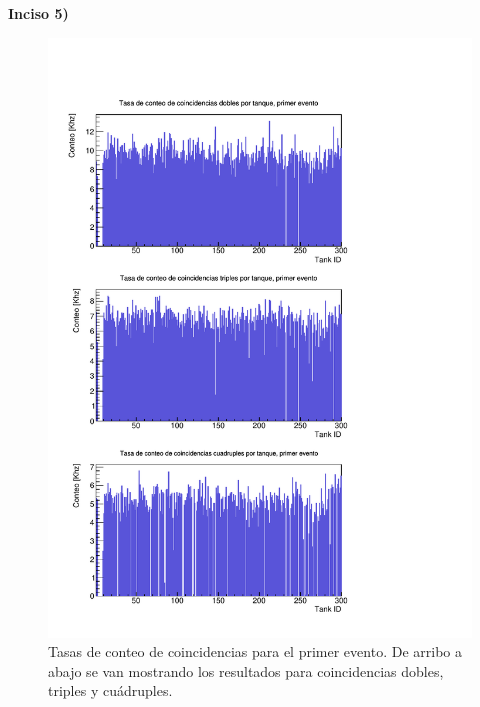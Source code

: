 \documentclass[11pt]{article}
\begin{document}
\textbf{Inciso 5)}

\begin{figure}[H]
\centering
\includegraphics[width=0.8 \textwidth]{../Figuras/Prob5PrimerEvento.pdf}
\caption{Tasas de conteo de coincidencias para el primer evento. De arribo a abajo se van mostrando los resultados para coincidencias dobles, triples y cuádruples.}
\label{fig:Prob5-1}
\end{figure}
\end{document}
